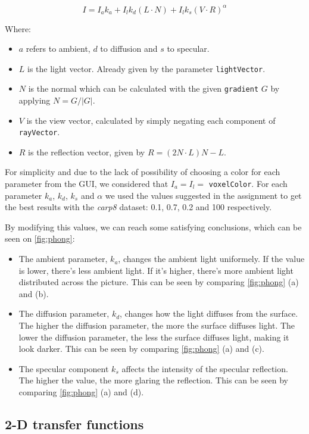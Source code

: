 \documentclass[a4paper]{article}
\begin{document}
$$ I = I_a k_a + I_lk_d(L \cdot N)+I_l k_s (V \cdot R)^\alpha$$

Where:
\begin{itemize}[noitemsep]
  \item $a$ refers to ambient, $d$ to diffusion and $s$ to specular.
  \item $L$ is the light vector. Already given by the parameter {\tt lightVector}.
  \item $N$ is the normal which can be calculated with the given {\tt gradient} $G$ by applying $N= {G}/{|G|}$.
  \item $V$ is the view vector, calculated by simply negating each component of {\tt rayVector}.
  \item $R$ is the reflection vector, given by $R = (2N \cdot L)N-L$.
\end{itemize}

For simplicity and due to the lack of possibility of choosing a color for each parameter from the GUI, we considered that $I_a=I_l=$ {\tt voxelColor}. For each parameter $k_a$, $k_d$, $k_s$ and $\alpha$ we used the values suggested in the assignment to get the best results with the \textit{carp8} dataset: 0.1, 0.7, 0.2 and 100 respectively.

By modifying this values, we can reach some satisfying conclusions, which can be seen on \autoref{fig:phong}:
\begin{itemize}[noitemsep]
  \item The ambient parameter, $k_a$, changes the ambient light uniformely. If the value is lower, there's less ambient light. If it's higher, there's more ambient light distributed across the picture. This can be seen by comparing \autoref{fig:phong} (a) and (b).
  \item The diffusion parameter, $k_d$, changes how the light diffuses from the surface. The higher the diffusion parameter, the more the surface diffuses light. The lower the diffusion parameter, the less the surface diffuses light, making it look darker. This can be seen by comparing \autoref{fig:phong} (a) and (c).
  \item The specular component $k_s$ affects the intensity of the specular reflection. The higher the value, the more glaring the reflection. This can be seen by comparing \autoref{fig:phong} (a) and (d).
\end{itemize}

\subsection{2-D transfer functions}
\end{document}

